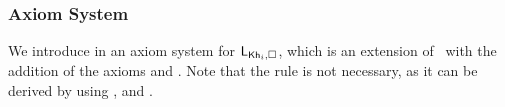 \subsubsection{Axiom System}

We introduce in  an axiom system for $\mathsf{L}_{{\sf Kh}_i,\square}$, which is an extension of~ with the addition of the axioms  and .
Note that the rule  is not necessary, as it can be derived by using ,  and .









